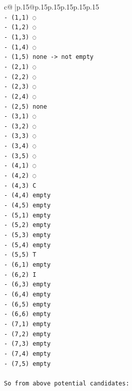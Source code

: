 \documentclass{article}
\begin{document}
{\begin{supertabular}{c@{$\;$}|p{.15\linewidth}@{}p{.15\linewidth}p{.15\linewidth}p{.15\linewidth}p{.15\linewidth}p{.15\linewidth}}
{{{\\ 
\texttt{{-} (1,1) ◌} \\
\texttt{{-} (1,2) ◌} \\
\texttt{{-} (1,3) ◌} \\
\texttt{{-} (1,4) ◌} \\
\texttt{{-} (1,5) none {-}> not empty} \\
\texttt{{-} (2,1) ◌} \\
\texttt{{-} (2,2) ◌} \\
\texttt{{-} (2,3) ◌} \\
\texttt{{-} (2,4) ◌} \\
\texttt{{-} (2,5) none} \\
\texttt{{-} (3,1) ◌} \\
\texttt{{-} (3,2) ◌} \\
\texttt{{-} (3,3) ◌} \\
\texttt{{-} (3,4) ◌} \\
\texttt{{-} (3,5) ◌} \\
\texttt{{-} (4,1) ◌} \\
\texttt{{-} (4,2) ◌} \\
\texttt{{-} (4,3) C} \\
\texttt{{-} (4,4) empty} \\
\texttt{{-} (4,5) empty} \\
\texttt{{-} (5,1) empty} \\
\texttt{{-} (5,2) empty} \\
\texttt{{-} (5,3) empty} \\
\texttt{{-} (5,4) empty} \\
\texttt{{-} (5,5) T} \\
\texttt{{-} (6,1) empty} \\
\texttt{{-} (6,2) I} \\
\texttt{{-} (6,3) empty} \\
\texttt{{-} (6,4) empty} \\
\texttt{{-} (6,5) empty} \\
\texttt{{-} (6,6) empty} \\
\texttt{{-} (7,1) empty} \\
\texttt{{-} (7,2) empty} \\
\texttt{{-} (7,3) empty} \\
\texttt{{-} (7,4) empty} \\
\texttt{{-} (7,5) empty} \\
\\ 
\texttt{So from above potential candidates:} \\
\\ 
}}}
\end{supertabular}}
\end{document}
